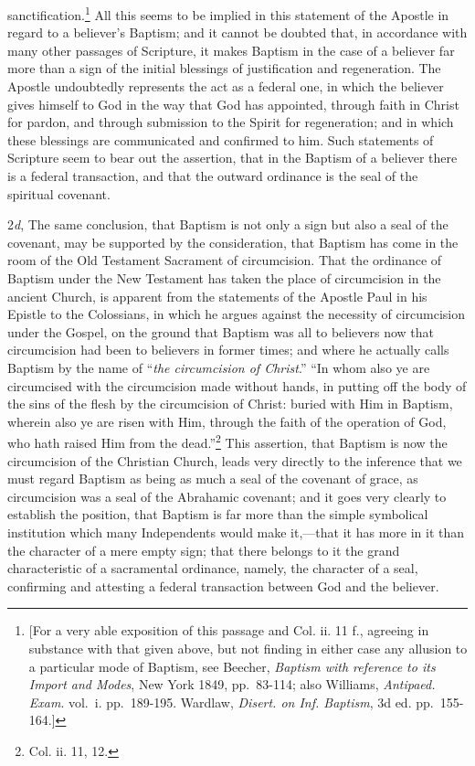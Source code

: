 \documentclass[english,]{book}
\begin{document}
sanctification.\footnote{{[}For a very able exposition of this passage and Col. ii. 11 f., agreeing in substance with that given above, but not finding in either case any allusion to a particular mode of Baptism, see Beecher, \emph{Baptism with reference to its Import and Modes}, New York 1849, pp.~83-114; also Williams, \emph{Antipaed. Exam}. vol.~i. pp.~189-195. Wardlaw, \emph{Disert. on Inf. Baptism}, 3d ed. pp.~155-164.{]}} All this seems to be implied in this statement of the Apostle in regard to a believer's Baptism; and it cannot be doubted that, in accordance with many other passages of Scripture, it makes Baptism in the case of a believer far more than a sign of the initial blessings of justification and regeneration. The Apostle undoubtedly represents the act as a federal one, in which the believer gives himself to God in the way that God has appointed, through faith in Christ for pardon, and through submission to the Spirit for regeneration; and in which these blessings are communicated and confirmed to him. Such statements of Scripture seem to bear out the assertion, that in the Baptism of a believer there is a federal transaction, and that the outward ordinance is the seal of the spiritual covenant.

2\emph{d}, The same conclusion, that Baptism is not only a sign but also a seal of the covenant, may be supported by the consideration, that Baptism has come in the room of the Old Testament Sacrament of circumcision. That the ordinance of Baptism under the New Testament has taken the place of circumcision in the ancient Church, is apparent from the statements of the Apostle Paul in his Epistle to the Colossians, in which he argues against the necessity of circumcision under the Gospel, on the ground that Baptism was all to believers now that circumcision had been to believers in former times; and where he actually calls Baptism by the name of ``\emph{the circumcision of Christ}.'' ``In whom also ye are circumcised with the circumcision made without hands, in putting off the body of the sins of the flesh by the circumcision of Christ: buried with Him in Baptism, wherein also ye are risen with Him, through the faith of the operation of God, who hath raised Him from the dead.''\footnote{Col. ii. 11, 12.} This assertion, that Baptism is now the circumcision of the Christian Church, leads very directly to the inference that we must regard Baptism as being as much a seal of the covenant of grace, as circumcision was a seal of the Abrahamic covenant; and it goes very clearly to establish the position, that Baptism is far more than the simple symbolical institution which many Independents would make it,---that it has more in it than the character of a mere empty sign; that there belongs to it the grand characteristic of a sacramental ordinance, namely, the character of a seal, confirming and attesting a federal transaction between God and the believer.
\end{document}
